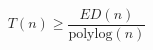 \documentclass{article}
\begin{document}
\[
T(n)\ge \frac{ED(n)}{\text{polylog}(n)}
\]
\end{document}
